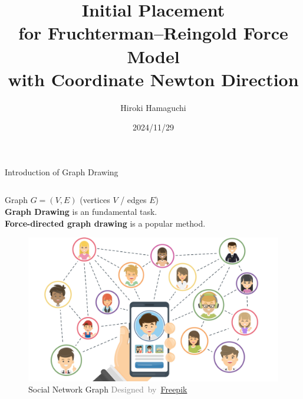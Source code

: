 \documentclass[dvipdfmx,13pt,aspectratio=169]{beamer}
\title{\huge{Initial Placement\\for Fruchterman--Reingold Force Model\\with Coordinate Newton Direction}}
\author{\Large{Hiroki Hamaguchi}}
\institute{\large{5th lab}\\\large{Supervisor: Prof. Akiko Takeda}}
\date{2024/11/29}
\newcommand{\gray}[1]{\textcolor{gray}{#1}}
\newif\ifShowHidden
\begin{document}
\ifShowHidden
  \maketitle
\fi

\ifShowHidden
  \section{Introduction}
\fi

\ifShowHidden
  \begin{frame}{Introduction of Graph Drawing}
    \begin{columns}
      \begin{column}{0.58\columnwidth}
        \large{%
          Graph $G = (V,E)$ (vertices $V$  / edges $E$)\\
          \textbf{Graph Drawing} \normalsize{is an fundamental task.}\\
          \textbf{Force-directed graph drawing} \normalsize{is a popular method.}
        }
        \begin{figure}[htbp]
          \centering
          \begin{minipage}{0.55\columnwidth}
            \centering
            \includegraphics[width=\columnwidth]{introExample/social.jpg}
            \caption*{
              Social Network Graph
              \gray{\footnotesize{Designed~by~\href{www.freepik.com}{Freepik}}}
            }
          \end{minipage}%
          \begin{minipage}{0.45\columnwidth}
            \centering

\end{minipage}
\end{figure}
\end{column}
\end{columns}
\end{frame}
\end{document}
